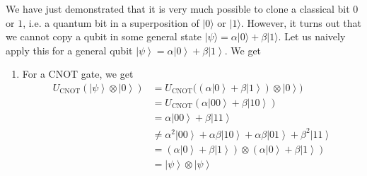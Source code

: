 \documentclass{article}
\newcommand{\ket}[1]{\ensuremath{\left|#1\right\rangle}}
\begin{document}
    We have just demonstrated that it is very much possible to clone a classical bit $0$ or $1$, i.e. a quantum bit in a superposition of $|0\rangle$ or $|1\rangle$. However, it turns out that we cannot copy a qubit in some general state $|\psi\rangle = \alpha |0\rangle + \beta |1\rangle$. Let us naively apply this for a general qubit $\ket{\psi} = \alpha \ket{0} + \beta \ket{1}$. We get

    \begin{enumerate}
      \item For a CNOT gate, we get 
      \begin{align} 
        U_{\mathrm{CNOT}} (\ket{\psi} \otimes \ket{0}) 
        & = U_{\mathrm{CNOT}} \big( (\alpha \ket{0} + \beta \ket{1}) \otimes \ket{0} \big) \\
        & = U_{\mathrm{CNOT}} (\alpha \ket{00} + \beta \ket{10}) \\
        & = \alpha \ket{00} + \beta \ket{11} \\
        & \neq \alpha^2 \ket{00} + \alpha \beta \ket{10} + \alpha \beta \ket{01} + \beta^2 \ket{11} \\ 
        & = (\alpha \ket{0} + \beta \ket{1}) \otimes (\alpha \ket{0} + \beta \ket{1}) \\ 
        & = \ket{\psi} \otimes \ket{\psi}
      \end{align}


\end{enumerate}
\end{document}

